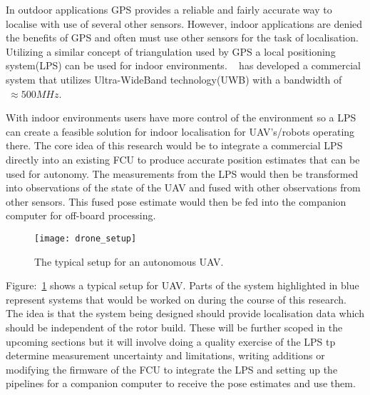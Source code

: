 In outdoor applications GPS provides a reliable and fairly accurate way to localise with use of several other sensors.
    However, indoor applications are denied the benefits of GPS and often must use other sensors for the task of localisation.
    Utilizing a similar concept of triangulation used by GPS a local positioning system(LPS) can be used for indoor environments.
    ~\citep{pozyx2018pozyx} has developed a commercial system that utilizes Ultra-WideBand technology(UWB) with a bandwidth of $~\approx 500MHz$.

    With indoor environments users have more control of the environment so a LPS can create a feasible solution for indoor localisation for UAV's/robots operating there.
    The core idea of this research would be to integrate a commercial LPS directly into an existing FCU to produce accurate position estimates that can be used for autonomy.
    The measurements from the LPS would then be transformed into observations of the state of the UAV and fused with other observations from other sensors.
    This fused pose estimate would then be fed into the companion computer for off-board processing.
    \begin{figure}[h!]
        \centering
        \texttt{[image: drone\_setup]}
        \caption{The typical setup for an autonomous UAV.}
        \label{fig:ds}
    \end{figure}

    Figure:~\ref{fig:ds} shows a typical setup for UAV.
    Parts of the system highlighted in blue represent systems that would be worked on during the course of this research.
    The idea is that the system being designed should provide localisation data which should be independent of the rotor build.
    These will be further scoped in the upcoming sections but it will involve doing a quality exercise of the LPS tp determine measurement uncertainty and limitations,
    writing additions or modifying the firmware of the FCU to integrate the LPS and setting up the pipelines for a companion computer to receive the pose estimates and use them.




